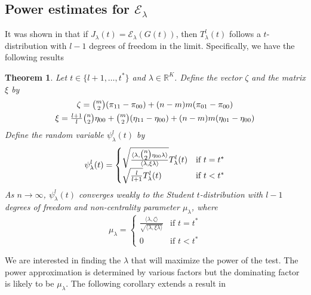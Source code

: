 \documentclass[final]{IEEEtran}
\newtheorem{theorem}{Theorem}
\theoremstyle{definition}
\begin{document}
\subsection{Power estimates for $\mathcal{E}_\lambda$}
It was shown in
\cite{lee:_laten_proces_model_time_attrib_random_graph} that if
$J_\lambda(t) = \mathcal{E}_{\lambda}(G(t))$, then $T_{\lambda}^{l}(t)$ 
follows a $t$-distribution with $l - 1$
degrees of freedom in the limit. Specifically, we have the following
results
\begin{theorem}
  \label{thm:9}
  Let $t \in \{l+1, \dots, t^{*}\}$ and $\lambda \in
  \mathbb{R}^{K}$. Define the vector $\zeta$ and the matrix $\xi$ by
  \begin{gather*}
    \zeta = \tbinom{m}{2}(\pi_{11} - \pi_{00}) + (n-m)m(\pi_{01} -
    \pi_{00}) \\
    \xi = \tfrac{l+1}{l}\tbinom{n}{2} \eta_{00} +
          \tbinom{m}{2}(\eta_{11} - \eta_{00}) + (n-m)m(\eta_{01} -
          \eta_{00})
  \end{gather*}
  Define the random variable $\psi^{l}_{\lambda}(t)$ by
  \begin{equation}
    \label{eq:10}
    \psi^{l}_{\lambda}(t) = \begin{cases}
      \sqrt{\frac{\langle \lambda, \tbinom{n}{2} \eta_{00}
            \lambda \rangle}{\langle \lambda, \xi
            \lambda \rangle}} T_{\lambda}^{l}(t) & \text{if $t = t^{*}$} \\
      \sqrt{\frac{l}{l + 1}} T_{\lambda}^{l}(t)& \text{if $t < t^{*}$}
      \end{cases}
  \end{equation}
As $n \rightarrow \infty$,
  $\psi^{l}_{\lambda}(t)$ converges weakly to the Student
  $t$-distribution with $l-1$ degrees of freedom and non-centrality
  parameter $\mu_{\lambda}$, where
  \begin{equation}
    \label{eq:15}
    \mu_{\lambda} = \begin{cases}
      \frac{\langle \lambda, \zeta \rangle}{\sqrt{\langle \lambda, \xi \lambda \rangle}} & \text{if $t = t^{*}$} \\
      0 & \text{if $t < t^{*}$}
    \end{cases}
  \end{equation}
\end{theorem}
We are interested in finding the $\lambda$ that will maximize the
power of the test. The power approximation is determined by various
factors but the dominating factor is likely to be
$\mu_{\lambda}$. The following corollary extends a result in
\end{document}
